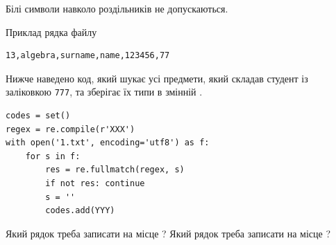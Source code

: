 \documentclass[12pt, ukrainian]{article}
\def\code#1{\Verb!#1!}
\begin{document}
{Білі символи навколо роздільників не допускаються.

Приклад рядка файлу



\begin{verbatim}
13,algebra,surname,name,123456,77
\end{verbatim}


Нижче наведено код, який шукає усі предмети, який складав студент із заліковкою \code{777}, та зберігає їх типи в змінній .



\begin{verbatim}
codes = set()
regex = re.compile(r'XXX')
with open('1.txt', encoding='utf8') as f:
    for s in f:
        res = re.fullmatch(regex, s)
        if not res: continue
        s = ''
        codes.add(YYY)
\end{verbatim}



Який рядок треба записати на місце  ?
Який рядок треба записати на місце  ?\par

}
\end{document}
